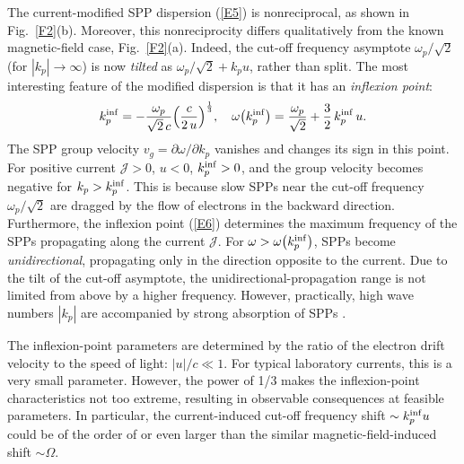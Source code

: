 \documentclass[9pt,twocolumn,twoside]{osajnl}
\begin{document}
The current-modified SPP dispersion (\ref{E5}) is nonreciprocal, as shown in Fig.~\ref{F2}(b). Moreover, this nonreciprocity differs qualitatively from the known magnetic-field case, Fig.~\ref{F2}(a). Indeed, the cut-off frequency asymptote ${\omega _p}/\sqrt 2$ (for $\left| {{k_p}} \right| \to \infty$) is now {\it tilted} as ${\omega _p}/\sqrt 2  + {{k_p}} u$, rather than split. The most interesting feature of the modified dispersion is that it has an {\it inflexion point}:
%
\begin{equation}
k_p^{\rm inf} =  - \frac{{{\omega _p}}}{{\sqrt{2}\,c}}{\left( {\frac{c}{2\,u}} \right)^{\frac{1}{3}}} , \quad
\omega\! \left( {k_p^{\rm inf}} \right) = \frac{{{\omega _p}}}{{\sqrt 2 }} + \frac{3}{2}\,k_p^{\rm inf}\,u .
\label{E6}
\end{equation}
%
The SPP group velocity ${v_g} = \partial \omega /\partial {k_p}$ vanishes and changes its sign in this point. For positive current ${\mathcal J} >0$, $u<0$, $k_p^{\rm inf} > 0$, and the group velocity becomes negative for $k_p >k_p^{\rm inf}$. This is because slow SPPs near the cut-off frequency ${\omega _p}/\sqrt 2$ are dragged by the flow of electrons in the backward direction. Furthermore, the inflexion point (\ref{E6}) determines the maximum frequency of the SPPs propagating along the current ${\bm{\mathcal J}}$. For $\omega > \omega\! \left( {k_p^{\rm inf }} \right)$, SPPs become {\it unidirectional}, propagating only in the direction opposite to the current. Due to the tilt of the cut-off asymptote, the unidirectional-propagation range is not limited from above by a higher frequency. However, practically, high wave numbers $\left| {{k_p}} \right|$ are accompanied by strong absorption of SPPs \cite{Maier}. 

The inflexion-point parameters are determined by the ratio of the electron drift velocity to the speed of light: $\left| u \right|/c \ll 1$. For typical laboratory currents, this is a very small parameter. However, the power of 1/3 makes the inflexion-point characteristics not too extreme, resulting in observable consequences at feasible parameters. In particular, the current-induced cut-off frequency shift $\sim k_p^{\rm inf }u$ could be of the order of or even larger than the similar magnetic-field-induced shift $\sim \Omega$. 
\end{document}
